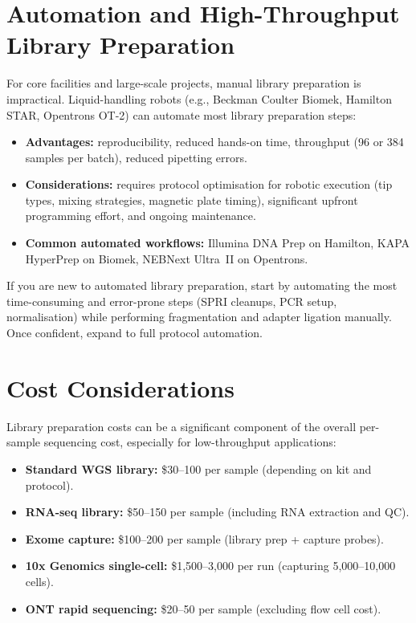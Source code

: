 \section{Automation and High-Throughput Library Preparation}
\label{sec:automation}

For core facilities and large-scale projects, manual library preparation is impractical. Liquid-handling robots (e.g., Beckman Coulter Biomek, Hamilton STAR, Opentrons OT-2) can automate most library preparation steps:

\begin{itemize}[nosep]
  \item \textbf{Advantages:} reproducibility, reduced hands-on time, throughput (96 or 384 samples per batch), reduced pipetting errors.
  \item \textbf{Considerations:} requires protocol optimisation for robotic execution (tip types, mixing strategies, magnetic plate timing), significant upfront programming effort, and ongoing maintenance.
  \item \textbf{Common automated workflows:} Illumina DNA Prep on Hamilton, KAPA HyperPrep on Biomek, NEBNext Ultra~II on Opentrons.
\end{itemize}

\begin{tipbox}[title={Starting with Automation}]
If you are new to automated library preparation, start by automating the most time-consuming and error-prone steps (SPRI cleanups, PCR setup, normalisation) while performing fragmentation and adapter ligation manually. Once confident, expand to full protocol automation.
\end{tipbox}


\section{Cost Considerations}
\label{sec:libprep_cost}

Library preparation costs can be a significant component of the overall per-sample sequencing cost, especially for low-throughput applications:

\begin{itemize}[nosep]
  \item \textbf{Standard WGS library:} \$30--100 per sample (depending on kit and protocol).
  \item \textbf{RNA-seq library:} \$50--150 per sample (including RNA extraction and QC).
  \item \textbf{Exome capture:} \$100--200 per sample (library prep + capture probes).
  \item \textbf{10x Genomics single-cell:} \$1{,}500--3{,}000 per run (capturing 5{,}000--10{,}000 cells).
  \item \textbf{ONT rapid sequencing:} \$20--50 per sample (excluding flow cell cost).
\end{itemize}

